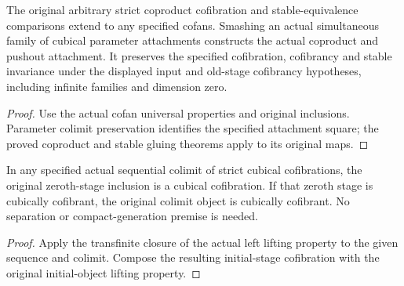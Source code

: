 \begin{proposition}
  \label{prop:actual-smash-parameter-cell-families}
  \leanok
  The original arbitrary strict coproduct cofibration and stable-equivalence comparisons extend to any specified cofans. Smashing an actual simultaneous family of cubical parameter attachments constructs the actual coproduct and pushout attachment. It preserves the specified cofibration, cofibrancy and stable invariance under the displayed input and old-stage cofibrancy hypotheses, including infinite families and dimension zero.
\end{proposition}
\begin{proof}
  Use the actual cofan universal properties and original inclusions. Parameter colimit preservation identifies the specified attachment square; the proved coproduct and stable gluing theorems apply to its original maps.
  \leanok
\end{proof}

\begin{proposition}
  \label{prop:actual-sequential-cofibration-closure}
  \leanok
  In any specified actual sequential colimit of strict cubical cofibrations, the original zeroth-stage inclusion is a cubical cofibration. If that zeroth stage is cubically cofibrant, the original colimit object is cubically cofibrant. No separation or compact-generation premise is needed.
\end{proposition}
\begin{proof}
  Apply the transfinite closure of the actual left lifting property to the given sequence and colimit. Compose the resulting initial-stage cofibration with the original initial-object lifting property.
  \leanok
\end{proof}

